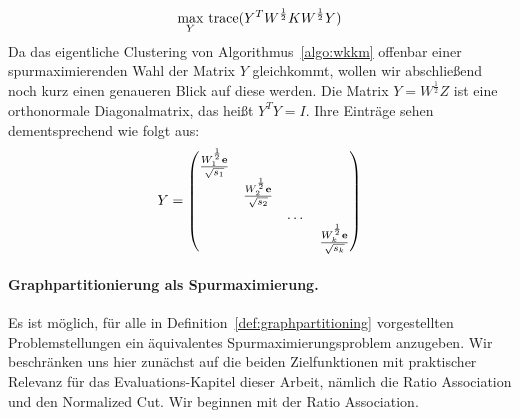 \begin{align}
\label{formula:wkkm-tracemax}
	\max_{Y}{} \operatorname*{trace}( Y^T W^{\frac{1}{2}} K W^{\frac{1}{2}} Y )
\end{align}
Da das eigentliche Clustering von Algorithmus~\ref{algo:wkkm} offenbar einer spurmaximierenden Wahl der Matrix $Y$ gleichkommt,
wollen wir abschließend noch kurz einen genaueren Blick auf diese werden.
Die Matrix $Y = W^{\frac{1}{2}} Z$ ist eine orthonormale Diagonalmatrix, das heißt $Y^T Y = I$. Ihre Einträge sehen
dementsprechend wie folgt aus:
\[ Y = 	\begin{pmatrix}
			\frac{W_1^{\frac{1}{2}} \mathbf{e}}{\sqrt{s_1}} & & & \\
			& \frac{W_2^{\frac{1}{2}} \mathbf{e}}{\sqrt{s_2}} & & \\
			& & \dots & \\
			& & & \frac{W_k^{\frac{1}{2}} \mathbf{e}}{\sqrt{s_k}}
		\end{pmatrix} \]

\paragraph{Graphpartitionierung als Spurmaximierung.}
Es ist möglich, für alle in Definition~\ref{def:graphpartitioning} vorgestellten Problemstellungen ein äquivalentes
Spurmaximierungsproblem anzugeben. Wir beschränken uns hier zunächst auf die beiden Zielfunktionen mit praktischer Relevanz
für das Evaluations-Kapitel dieser Arbeit, nämlich die Ratio Association und den Normalized Cut. Wir beginnen mit der
Ratio Association.

